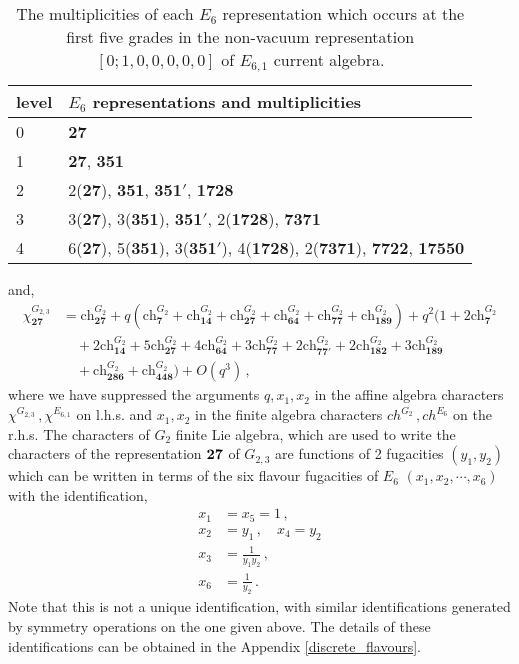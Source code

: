\documentclass[a4paper,12pt]{article}
\begin{document}
\begin{table}
\centering
\begin{tabular}{ |p{2cm}|p{8cm}|  }
\hline
level & $E_ 6$ representations and multiplicities \\
\hline
0 & {\bf 27} \\
\hline
1 &  {\bf 27}, {\bf 351} \\
\hline
2 & 2({\bf 27}), {\bf 351}, {\bf 351$'$}, {\bf 1728}\\
\hline
3 & 3({\bf 27}), 3({\bf 351}), {\bf 351$'$}, 2({\bf 1728}), {\bf 7371}\\
\hline
4 & 6({\bf 27}), 5({\bf 351}), 3({\bf 351$'$}), 4({\bf 1728}), 2({\bf 7371}), {\bf 7722},  {\bf 17550}\\
\hline
\end{tabular}
\caption{The multiplicities of each $E_6$ representation which occurs at the first five grades in the non-vacuum representation $[0;1,0,0,0,0,0]$ of $E_{6,1}$ current algebra.}
\label{table: e6-level-1-reps}
\end{table} 
and,
\begin{align}\label{g2-level3-non-vacuum}
    \chi^{G_{2,3}}_\mathbf{27}&=\mathrm{ch}^{G_2}_\mathbf{27}+
    q(\mathrm{ch}^{G_2}_\mathbf{7}+\mathrm{ch}^{G_2}_\mathbf{14}+\mathrm{ch}^{G_2}_\mathbf{27}+\mathrm{ch}^{G_2}_\mathbf{64}+\mathrm{ch}^{G_2}_\mathbf{77}+\mathrm{ch}^{G_2}_\mathbf{189})+q^2(1+2\mathrm{ch}^{G_2}_\mathbf{7}\nonumber\\
    &\quad+2\mathrm{ch}^{G_2}_\mathbf{14}+5\mathrm{ch}^{G_2}_\mathbf{27}+4\mathrm{ch}^{G_2}_\mathbf{64}+3\mathrm{ch}^{G_2}_\mathbf{77}+2\mathrm{ch}^{G_2}_\mathbf{77'}+2\mathrm{ch}^{G_2}_\mathbf{182}+3\mathrm{ch}^{G_2}_\mathbf{189}\nonumber\\
    &\quad+\mathrm{ch}^{G_2}_\mathbf{286}+\mathrm{ch}^{G_2}_\mathbf{448})+\textit{O}(q^3)\, , 
\end{align}
where we have suppressed the arguments $q,x_1,x_2$ in the affine algebra characters $\chi^{G_{2,3}}\, ,\chi^{E_{6,1}}$ on l.h.s. and $x_1, x_2$ in the finite algebra characters $ch^{G_2}\, ,ch^{E_6}$ on the r.h.s. The characters of $G_2$ finite Lie algebra, which are used to write the characters of the representation $\bf 27$ of $G_{2,3}$ are functions of 2 fugacities $(y_1,y_2)$ which can be written in terms of the six flavour fugacities of $E_6$ $(x_1,x_2,\cdots,x_6)$ with the identification,
\begin{align}\label{e6-flavours-to-g2-flavours}
    x_1&=x_5=1\, ,\nonumber\\
    x_2&=y_1\, ,\quad x_4=y_2\nonumber\\
    x_3&=\frac{1}{y_1 y_2}\, ,\nonumber\\
    x_6&=\frac{1}{y_2}\, .
\end{align}
Note that this is not a unique identification, with similar identifications generated by symmetry operations on the one given above. The details of these identifications can be obtained in the Appendix \ref{discrete_flavours}. 
\end{document}
